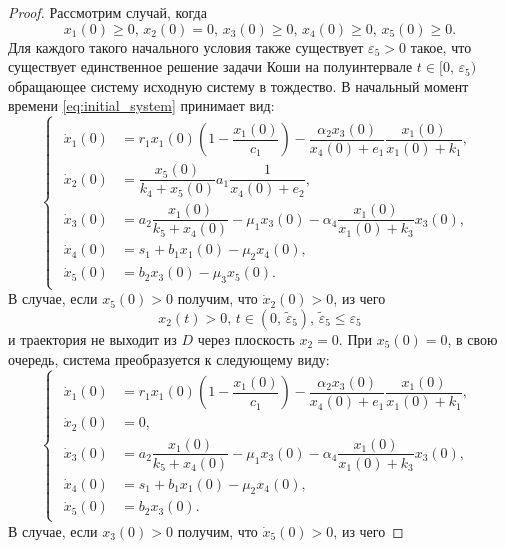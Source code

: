 \documentclass[14pt,a4paper]{extarticle}
\begin{document}
\begin{proof}
		Рассмотрим случай, когда
		\begin{equation}\label{eq:conds_5}
			x_1(0)\ge0,\, x_2(0)=0,\, x_3(0)\ge0,\, x_4(0)\ge0,\, x_5(0)\ge0.
		\end{equation}
		Для каждого такого начального условия также существует $\varepsilon_5>0$ такое, что существует единственное решение задачи Коши на полуинтервале $t\in[0,\,\varepsilon_5)$ обращающее систему исходную систему в тождество. В начальный момент времени \ref{eq:initial_system} принимает вид: 
		\begin{equation*}
			\begin{cases}
				\begin{aligned}
					\dot{x}_1(0) &= r_1x_1(0)\left(1-\dfrac{x_1(0)}{c_1}\right)-\dfrac{\alpha_2x_3(0)}{x_4(0)+e_1}\dfrac{x_1(0)}{x_1(0)+k_1},\\
					\dot{x}_2(0) &= \dfrac{x_5(0)}{k_4+x_5(0)}a_1\dfrac{1}{x_4(0)+e_2},\\
					\dot{x}_3(0) &= a_2\dfrac{x_1(0)}{k_5+x_4(0)}-\mu_1x_3(0)-\alpha_4\dfrac{x_1(0)}{x_1(0)+k_3}x_3(0),\\
					\dot{x}_4(0) &= s_1 + b_1x_1(0)-\mu_2x_4(0),\\
					\dot{x}_5(0) &= b_2x_3(0)-\mu_3x_5(0).
				\end{aligned}
			\end{cases}
		\end{equation*} 
		В случае, если $x_5(0)>0$ получим, что $\dot{x}_2(0)>0$, из чего 
		\[x_2(t)>0,\, t\in(0,\, \tilde{\varepsilon}_5),\,\tilde{\varepsilon}_5\le\varepsilon_5\]
		и траектория не выходит из $D$ через плоскость $x_2=0$. При $x_5(0)=0$, в свою очередь, система преобразуется к следующему виду:
		\begin{equation*}
			\begin{cases}
				\begin{aligned}
					\dot{x}_1(0) &= r_1x_1(0)\left(1-\dfrac{x_1(0)}{c_1}\right)-\dfrac{\alpha_2x_3(0)}{x_4(0)+e_1}\dfrac{x_1(0)}{x_1(0)+k_1},\\
					\dot{x}_2(0) &= 0,\\
					\dot{x}_3(0) &= a_2\dfrac{x_1(0)}{k_5+x_4(0)}-\mu_1x_3(0)-\alpha_4\dfrac{x_1(0)}{x_1(0)+k_3}x_3(0),\\
					\dot{x}_4(0) &= s_1 + b_1x_1(0)-\mu_2x_4(0),\\
					\dot{x}_5(0) &= b_2x_3(0).
				\end{aligned}
			\end{cases}
		\end{equation*}  
		В случае, если $x_3(0)>0$ получим, что $\dot{x}_5(0)>0$, из чего 

\end{proof}
\end{document}
